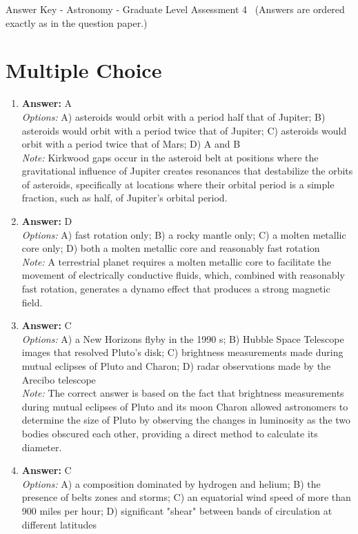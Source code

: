 \documentclass[12pt]{article}
\begin{document}
\begin{center}
Answer Key - Astronomy - Graduate Level Assessment 4 \
\small (Answers are ordered exactly as in the question paper.)
\end{center}

\section*{Multiple Choice}
\begin{enumerate}[label=\arabic*.]
\item \textbf{Answer:} A
\\ \textit{Options:} A) asteroids would orbit with a period half that of Jupiter; B) asteroids would orbit with a period twice that of Jupiter; C) asteroids would orbit with a period twice that of Mars; D) A and B
\\ \textit{Note:} Kirkwood gaps occur in the asteroid belt at positions where the gravitational influence of Jupiter creates resonances that destabilize the orbits of asteroids, specifically at locations where their orbital period is a simple fraction, such as half, of Jupiter's orbital period.
\item \textbf{Answer:} D
\\ \textit{Options:} A) fast rotation only; B) a rocky mantle only; C) a molten metallic core only; D) both a molten metallic core and reasonably fast rotation
\\ \textit{Note:} A terrestrial planet requires a molten metallic core to facilitate the movement of electrically conductive fluids, which, combined with reasonably fast rotation, generates a dynamo effect that produces a strong magnetic field.
\item \textbf{Answer:} C
\\ \textit{Options:} A) a New Horizons flyby in the 1990 s; B) Hubble Space Telescope images that resolved Pluto's disk; C) brightness measurements made during mutual eclipses of Pluto and Charon; D) radar observations made by the Arecibo telescope
\\ \textit{Note:} The correct answer is based on the fact that brightness measurements during mutual eclipses of Pluto and its moon Charon allowed astronomers to determine the size of Pluto by observing the changes in luminosity as the two bodies obscured each other, providing a direct method to calculate its diameter.
\item \textbf{Answer:} C
\\ \textit{Options:} A) a composition dominated by hydrogen and helium; B) the presence of belts zones and storms; C) an equatorial wind speed of more than 900 miles per hour; D) significant "shear" between bands of circulation at different latitudes

\end{enumerate}
\end{document}
